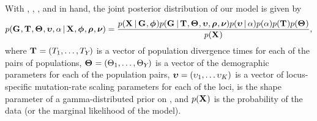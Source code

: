 \documentclass[letterpaper,12pt]{article}
\begin{document}
\begin{linenumbers}
\begin{linenomath}
With \alignmentVector, \hkyModelVector, \ploidyScalarVector, and
\mutationRateScalarConstantVector in hand, the joint posterior distribution
of our model is given by
\begin{equation}
    p(\geneTreeVector, \divTimeMapVector, \demographicParamVector, 
    \locusMutationRateScalarVector, \locusRateHetShapeParameter \given
    \alignmentVector, \hkyModelVector, \ploidyScalarVector,
    \mutationRateScalarConstantVector) =
    \frac{p(\alignmentVector \given \geneTreeVector, \hkyModelVector)
        p(\geneTreeVector \given \divTimeMapVector, \demographicParamVector,
        \locusMutationRateScalarVector, \ploidyScalarVector,
        \mutationRateScalarConstantVector)
        p(\locusMutationRateScalarVector \given \locusRateHetShapeParameter)
        p(\locusRateHetShapeParameter)
        p(\divTimeMapVector)
        p(\demographicParamVector)}{
        p(\alignmentVector)},
    \label{eq:fullModelCompact}
\end{equation}
where
$\mathbf{T_{}} = (T_{1}, \ldots, T_{Y_{}})$
is a vector of population divergence times for each of the \npairs{} pairs of
populations,
$\mathbf{\Theta_{}} = (\Theta_{1}, \ldots,
\Theta_{Y_{}})$
is a vector of the demographic parameters for each of the \npairs{} population
pairs,
$\boldsymbol{\upsilon} = (\upsilon_{1}, \ldots
\upsilon_{K})$
is a vector of locus-specific mutation-rate scaling parameters for each of the
\nlociTotal loci,
\locusRateHetShapeParameter is the shape parameter of a gamma-distributed
prior on \locusMutationRateScalar{}, and
$p(\alignmentVector)$ is the probability of the data (or the marginal
likelihood of the model).
\end{linenomath}


\end{linenumbers}
\end{document}
